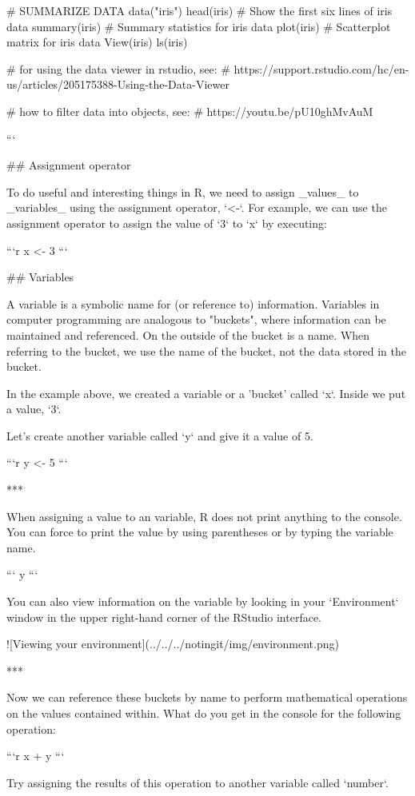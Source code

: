# SUMMARIZE DATA
data("iris")
head(iris)         # Show the first six lines of iris data
summary(iris)      # Summary statistics for iris data
plot(iris)         # Scatterplot matrix for iris data
View(iris)
ls(iris)

# for using the data viewer in rstudio, see:
# https://support.rstudio.com/hc/en-us/articles/205175388-Using-the-Data-Viewer

# how to filter data into objects, see:
# https://youtu.be/pU10ghMvAuM

```

## Assignment operator

To do useful and interesting things in R, we need to assign _values_ to
_variables_ using the assignment operator, `<-`.  For example, we can use the assignment operator to assign the value of `3` to `x` by executing:

```r
x <- 3
```

## Variables

A variable is a symbolic name for (or reference to) information. Variables in computer programming are analogous to "buckets", where information can be maintained and referenced. On the outside of the bucket is a name. When referring to the bucket, we use the name of the bucket, not the data stored in the bucket.

In the example above, we created a variable or a 'bucket' called `x`. Inside we put a value, `3`. 

Let's create another variable called `y` and give it a value of 5. 

```r
y <- 5
```

***

When assigning a value to an variable, R does not print anything to the console. You can force to print the value by using parentheses or by typing the variable name.

```
y
```

You can also view information on the variable by looking in your `Environment` window in the upper right-hand corner of the RStudio interface.

![Viewing your environment](../../../notingit/img/environment.png)

***

Now we can reference these buckets by name to perform mathematical operations on the values contained within. What do you get in the console for the following operation: 

```r
x + y
```

Try assigning the results of this operation to another variable called `number`. 

